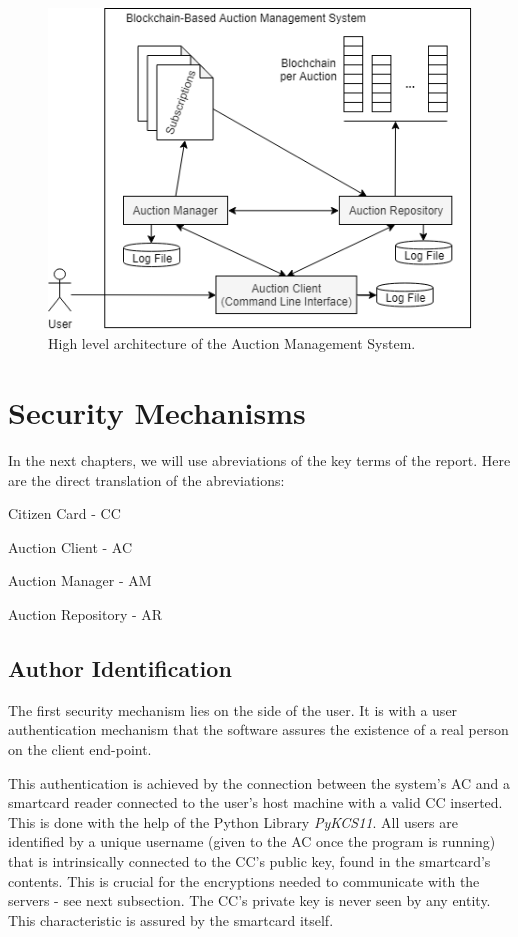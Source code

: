 \documentclass[a4paper]{article}
\begin{document}
\begin{figure}[H]
\centering
\includegraphics[width=0.65\linewidth]{SA.png}
\caption{High level architecture of the Auction Management System.}
\label{fig:sa}
\end{figure}

\newpage
\section{Security Mechanisms} %
\label{sec:securitymechanisms}

In the next chapters, we will use abreviations of the key terms of the report. 
Here are the direct translation of the abreviations:

Citizen Card - CC

Auction Client - AC

Auction Manager - AM

Auction Repository - AR

\subsection{Author Identification}
\label{subsec:authoridentification}

The first security mechanism lies on the side of the user. 
It is with a user authentication mechanism that the software assures the existence of a real person on the client end-point.

This authentication is achieved by the connection between the system's AC and a smartcard reader connected to the user's host machine with a valid CC inserted.
This is done with the help of the Python Library \emph{PyKCS11}.
All users are identified by a unique username (given to the AC once the program is running) that is intrinsically connected to the CC's public key, found in the smartcard's contents. 
This is crucial for the encryptions needed to communicate with the servers - see next subsection. 
The CC's private key is never seen by any entity. This characteristic is assured by the smartcard itself.
\end{document}
